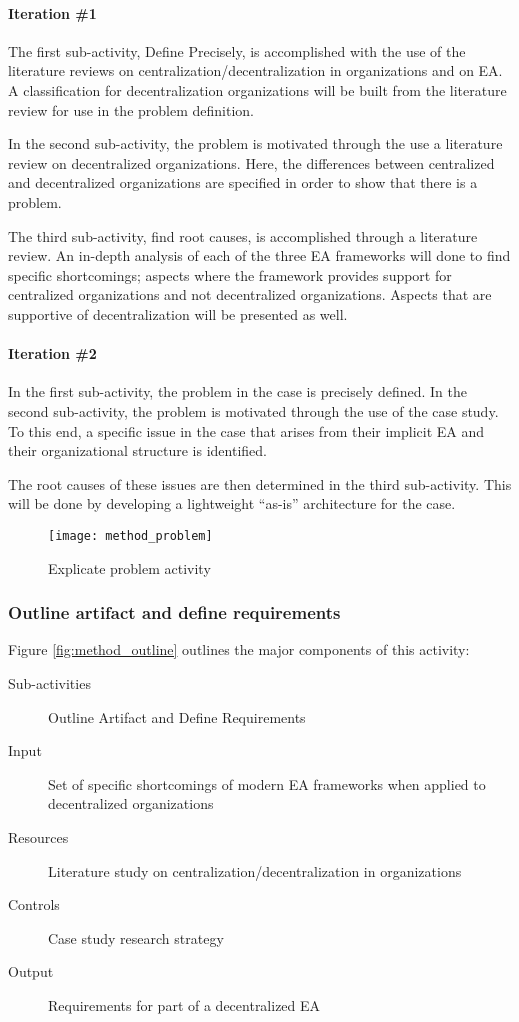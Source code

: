 \paragraph{Iteration \#1}

The first sub-activity, Define Precisely, is accomplished with the use of the literature reviews on centralization/decentralization in  organizations and on EA. A classification for decentralization organizations will be built from the literature review for use in the problem definition. 

In the second sub-activity, the problem is motivated through the use a literature review on decentralized organizations. Here, the differences between centralized and decentralized  organizations are specified in order to show that there is a problem. 

The third sub-activity, find root causes, is accomplished through a literature review. An in-depth analysis of each of the three EA frameworks will done to find specific shortcomings; aspects where the framework provides support for centralized organizations and not decentralized organizations. Aspects that are supportive of decentralization will be presented as well.

\paragraph{Iteration \#2}

In the first sub-activity, the problem in the case is precisely defined. In the second sub-activity, the problem is motivated through the use of the case study. To this end, a specific issue in the case that arises from their implicit EA and their organizational structure is identified.

The root causes of these issues are then determined in the third sub-activity. This will be done by developing a lightweight ``as-is'' architecture for the case. 

\begin{figure}
\texttt{[image: method\_problem]}
\caption{Explicate problem activity}
\label{fig:method_problem}
\end{figure}

\subsubsection*{Outline artifact and define requirements}

Figure \ref{fig:method_outline} outlines the major components of this activity:
\begin{description}
  \item[Sub-activities] Outline Artifact and Define Requirements~\cite[Ch. 6]{johannessonPerjons2012}
  \item[Input] Set of specific shortcomings of modern EA frameworks when applied to decentralized organizations
  \item[Resources] Literature study on centralization/decentralization in  organizations
  \item[Controls] Case study research strategy
  \item[Output] Requirements for part of a decentralized EA
\end{description}

